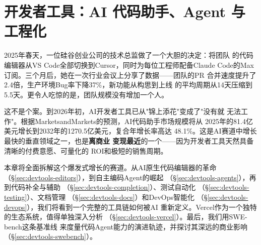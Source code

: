 
\chapter{开发者工具：AI 代码助手、Agent 与工程化}
\label{ch:devtools}

2025年春天，一位硅谷创业公司的技术总监做了一个大胆的决定：将团队
的代码编辑器从VS Code全部切换到Cursor，同时为每位工程师配备Claude
Code的Max订阅。三个月后，她在一次行业会议上分享了数据——团队的PR
合并速度提升了2.4倍，生产环境Bug率下降37\%，新功能从构思到上线
的平均周期从14天压缩到5.5天。更令人吃惊的是，团队规模没有增加一个人。

这不是个案。到2026年初，AI开发者工具已从"锦上添花"变成了"没有就
无法工作"。根据MarketsandMarkets的预测，AI代码助手市场规模将从
2025年的81.4亿美元增长到2032年的1270.5亿美元，复合年增长率高达
48.1\%。这是AI赛道中增长最快的垂直领域之一，也是\textbf{离商业
变现最近}的一个——因为开发者工具天然具备清晰的付费意愿、可量化的
ROI和极短的销售周期。

本章将全面拆解这个爆发式增长的赛道。从AI原生代码编辑器的革命
（\S\ref{sec:devtools-editors}），到自主编码Agent的崛起
（\S\ref{sec:devtools-agents}），再到代码补全与辅助
（\S\ref{sec:devtools-completion}）、测试自动化
（\S\ref{sec:devtools-testing}）、文档管理
（\S\ref{sec:devtools-docs}）和DevOps智能化
（\S\ref{sec:devtools-devops}），我们将看到一个完整的工具链如何被AI
重新定义。Vercel作为一个独特的生态系统，值得单独深入分析
（\S\ref{sec:devtools-vercel}）。最后，我们用SWE-bench这条基准线
来度量代码Agent能力的演进轨迹，并探讨其深远的商业影响
（\S\ref{sec:devtools-swebench}）。

